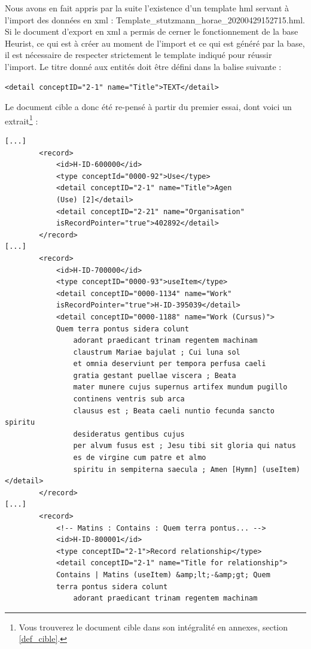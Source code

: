 \documentclass[a4paper,12pt,twoside]{book}
\begin{document}
Nous avons en fait appris par la suite l'existence d'un template hml servant à l'import des données en xml : Template\_stutzmann\_horae\_20200429152715.hml. Si le document d'export en xml a permis de cerner le fonctionnement de la base Heurist, ce qui est à créer au moment de l'import et ce qui est généré par la base, il est nécessaire de respecter strictement le template indiqué pour réussir l'import. Le titre donné aux entités doit 
être défini dans la balise suivante :
\begin{verbatim}
<detail conceptID="2-1" name="Title">TEXT</detail>
\end{verbatim}
Le document cible a donc été re-pensé à partir du premier essai, dont voici un extrait\footnote{Vous trouverez le document cible dans son intégralité en annexes, section \ref{def_cible}.} : 
\begin{verbatim}
[...]
        <record>
            <id>H-ID-600000</id>
            <type conceptId="0000-92">Use</type>
            <detail conceptID="2-1" name="Title">Agen 
            (Use) [2]</detail>
            <detail conceptID="2-21" name="Organisation" 
            isRecordPointer="true">402892</detail>
        </record>
[...]
        <record>
            <id>H-ID-700000</id>
            <type conceptID="0000-93">useItem</type>
            <detail conceptID="0000-1134" name="Work" 
            isRecordPointer="true">H-ID-395039</detail>
            <detail conceptID="0000-1188" name="Work (Cursus)">
            Quem terra pontus sidera colunt
                adorant praedicant trinam regentem machinam 
                claustrum Mariae bajulat ; Cui luna sol
                et omnia deserviunt per tempora perfusa caeli 
                gratia gestant puellae viscera ; Beata
                mater munere cujus supernus artifex mundum pugillo
                continens ventris sub arca
                clausus est ; Beata caeli nuntio fecunda sancto spiritu
                desideratus gentibus cujus
                per alvum fusus est ; Jesu tibi sit gloria qui natus
                es de virgine cum patre et almo
                spiritu in sempiterna saecula ; Amen [Hymn] (useItem)</detail>
        </record>
[...]
        <record>
            <!-- Matins : Contains : Quem terra pontus... -->
            <id>H-ID-800001</id>
            <type conceptID="2-1">Record relationship</type>
            <detail conceptID="2-1" name="Title for relationship">
            Contains | Matins (useItem) &amp;lt;-&amp;gt; Quem 
            terra pontus sidera colunt
                adorant praedicant trinam regentem machinam 

\end{verbatim}
\end{document}
